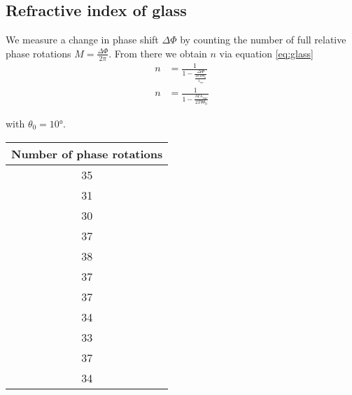 \subsection{Refractive index of glass}
We measure a change in phase shift $\Delta \Phi$ by counting the number of full
relative phase rotations $M = \frac{\Delta \Phi}{2 \pi}$. From there we obtain $n$ via
equation \eqref{eq:glass}
\begin{align}
	n&=\frac{1}{1-\frac{\Delta \Phi}{\frac{4\pi T\theta \theta_0}{\lambda_{vac}}}}\\
	n&=\frac{1}{1-\frac{M\lambda_{vac}}{2 T \theta \theta_0}}
	\label{eq:nAtmos}
\end{align}

with $\theta_0 = 10°$.
\begin{table}[H]
	\centering
	\begin{tabular}{c}
		\toprule
		Number of phase rotations \\
		\midrule
		35                        \\
		31                        \\
		30                        \\
		37                        \\
		38                        \\
		37                        \\
		37                        \\
		34                        \\
		33                        \\
		37                        \\
		34                        \\
		\bottomrule
	\end{tabular}
\end{table}

